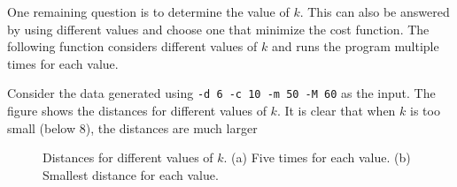 One remaining question is to determine the value of $k$.  This can
also be answered by using different values and choose one that
minimize the cost function.  The following function considers
different values of $k$ and runs the program multiple times for each
value.

\resetlinenumber[1]
\linenumbers
\begin{tt}
  
\end{tt}
\nolinenumbers

Consider the data generated using {\tt -d 6 -c 10 -m 50 -M 60} as the
input.  The figure shows the distances for different values of $k$.
It is clear that when $k$ is too small (below 8), the distances
are much larger

\begin{figure}[h] \centering
\caption{Distances for different values of $k$. (a) Five times for each
value. (b) Smallest distance for each value.}
\end{figure}
